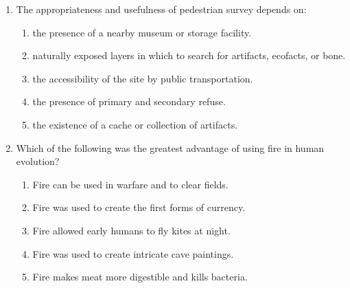 \documentclass[12pt]{article}
\begin{document}
\begin{enumerate}[label=\arabic*.]
\item The appropriateness and usefulness of pedestrian survey depends on:
\begin{enumerate}[label=(\alph*)]
    \item the presence of a nearby museum or storage facility.
    \item naturally exposed layers in which to search for artifacts, ecofacts, or bone.
    \item the accessibility of the site by public transportation.
    \item the presence of primary and secondary refuse.
    \item the existence of a cache or collection of artifacts.
\end{enumerate}
\item Which of the following was the greatest advantage of using fire in human evolution?
\begin{enumerate}[label=(\alph*)]
    \item Fire can be used in warfare and to clear fields.
    \item Fire was used to create the first forms of currency.
    \item Fire allowed early humans to fly kites at night.
    \item Fire was used to create intricate cave paintings.
    \item Fire makes meat more digestible and kills bacteria.
\end{enumerate}
\end{enumerate}
\end{document}
